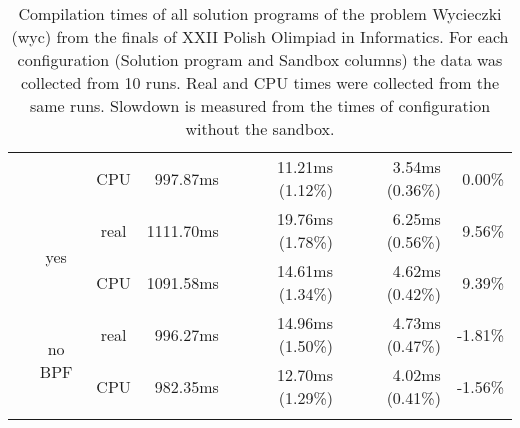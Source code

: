 \documentclass[en]{pracamgr}
\begin{document}
\begin{appendices}
\begin{small}
\begin{longtable}{|l|c|c|r|r|r|r|}
                            &                         & CPU  & 997.87ms & 11.21ms (1.12\%) & 3.54ms (0.36\%) & 0.00\% \\*
                            \cline{2-7}
                            & \multirow{2}{*}{yes}    & real & 1111.70ms & 19.76ms (1.78\%) & 6.25ms (0.56\%) & 9.56\% \\*
                            &                         & CPU  & 1091.58ms & 14.61ms (1.34\%) & 4.62ms (0.42\%) & 9.39\% \\*
                            \cline{2-7}
                            & \multirow{2}{*}{no BPF} & real & 996.27ms & 14.96ms (1.50\%) & 4.73ms (0.47\%) & -1.81\% \\*
                            &                         & CPU  & 982.35ms & 12.70ms (1.29\%) & 4.02ms (0.41\%) & -1.56\% \\
\hline
\pagebreak
\caption{Compilation times of all solution programs of the problem Wycieczki (wyc) from the finals of XXII Polish Olimpiad in Informatics. For each configuration (Solution program and Sandbox columns) the data was collected from 10 runs. Real and CPU times were collected from the same runs. Slowdown is measured from the times of configuration without the sandbox.}
\label{table:wyc_compilation}
\end{longtable}
\end{small}


\end{appendices}
\end{document}
